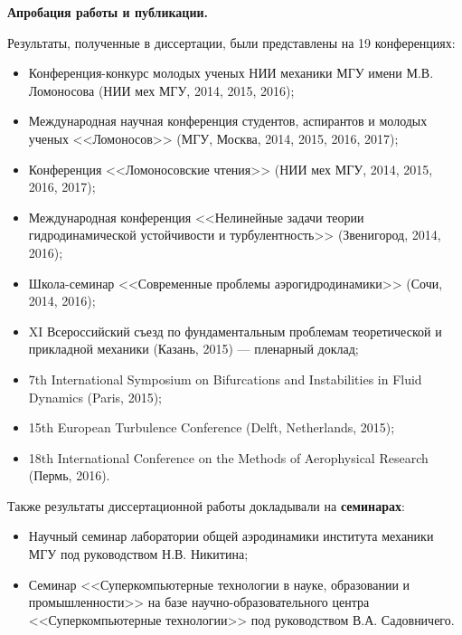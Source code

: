 {\bf Апробация работы и публикации.}

Результаты, полученные в диссертации, были представлены на 19 конференциях: 
\begin{itemize}
\item Конференция-конкурс молодых ученых НИИ механики МГУ имени М.В. Ломоносова (НИИ мех МГУ, 2014, 2015, 2016); 
\item Международная научная конференция студентов, аспирантов и молодых ученых <<Ломоносов>> (МГУ, Москва, 2014, 2015, 2016, 2017); 
\item Конференция <<Ломоносовские чтения>> (НИИ мех МГУ, 2014, 2015, 2016, 2017); 
\item Международная конференция <<Нелинейные задачи теории гидродинамической устойчивости и турбулентность>> (Звенигород, 2014, 2016); 
\item Школа-семинар <<Современные проблемы аэрогидродинамики>> (Сочи, 2014, 2016);  
\item XI Всероссийский съезд по фундаментальным проблемам теоретической и прикладной механики (Казань, 2015) --- пленарный доклад;
\item 7th International Symposium on Bifurcations and Instabilities in Fluid Dynamics (Paris, 2015);
\item 15th European Turbulence Conference (Delft, Netherlands, 2015); 
\item 18th International Conference on the Methods of Aerophysical Research (Пермь, 2016).
\end{itemize}

Также результаты диссертационной работы докладывали на {\bf семинарах}:
\begin{itemize}
\item Научный семинар лаборатории общей аэродинамики института механики МГУ под руководством  Н.В.  Никитина;
\item Семинар <<Суперкомпьютерные технологии в науке, образовании и промышленности>> на базе научно-образовательного центра <<Суперкомпьютерные технологии>> под руководством В.А. Садовничего. 
\end{itemize}

